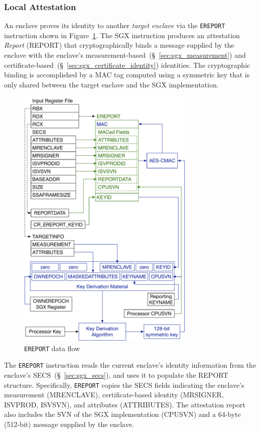 \subsubsection{Local Attestation}
\label{sec:sgx_ereport}

An enclave proves its identity to another \textit{target enclave} via the
\texttt{EREPORT} instruction shown in Figure~\ref{fig:sgx_ereport}. The SGX
instruction produces an attestation \textit{Report} (REPORT) that
cryptographically binds a message supplied by the enclave with the enclave's
measurement-based~(\S~\ref{sec:sgx_measurement}) and
certificate-based~(\S~\ref{sec:sgx_certificate_identity}) identities. The
cryptographic binding is accomplished by a MAC tag computed using a symmetric
key that is only shared between the target enclave and the SGX implementation.

\begin{figure}[hbt]
  \centering
  \includegraphics[width=85mm]{figures/sgx_ereport.pdf}
  \caption{
    \texttt{EREPORT} data flow
  }
  \label{fig:sgx_ereport}
\end{figure}

The \texttt{EREPORT} instruction reads the current enclave's identity
information from the enclave's SECS~(\S~\ref{sec:sgx_secs}), and uses it to
populate the REPORT structure. Specifically, \texttt{EREPORT} copies the
SECS fields indicating the enclave's measurement (MRENCLAVE), certificate-based
identity (MRSIGNER, ISVPROD, ISVSVN), and attributes (ATTRIBUTES). The
attestation report also includes the SVN of the SGX implementation (CPUSVN)
and a 64-byte (512-bit) message supplied by the enclave.

